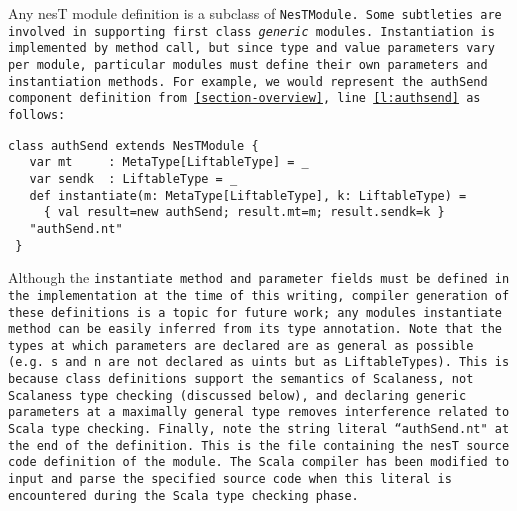 Any nesT module definition is a subclass of \tt{NesTModule}. Some subtleties are involved in
supporting first class \emph{generic} modules. Instantiation is implemented by method call, but
since type and value parameters vary per module, particular modules must define their own
parameters and instantiation methods. For example, we would represent the \tt{authSend}
component definition from \autoref{section-overview}, line \ref{l:authsend} as follows:
\begin{Verbatim}[fontfamily=cmtt,fontsize=\scriptsize]
 class authSend extends NesTModule {
   var mt     : MetaType[LiftableType] = _
   var sendk  : LiftableType = _
   def instantiate(m: MetaType[LiftableType], k: LiftableType) =
     { val result=new authSend; result.mt=m; result.sendk=k }
   "authSend.nt"
 }
\end{Verbatim}
Although the \tt{instantiate} method and parameter fields must be defined in the implementation
at the time of this writing, compiler generation of these definitions is a topic for future
work; any modules instantiate method can be easily inferred from its type annotation. Note that
the types at which parameters are declared are as general as possible (e.g.~\tt{s} and \tt{n}
are not declared as \tt{uint}s but as \tt{LiftableType}s). This is because class definitions
support the semantics of Scalaness, not Scalaness type checking (discussed below), and declaring
generic parameters at a maximally general type removes interference related to Scala type
checking. Finally, note the string literal \tt{``authSend.nt"} at the end of the definition.
This is the file containing the nesT source code definition of the module. The Scala compiler
has been modified to input and parse the specified source code when this literal is encountered
during the Scala type checking phase.


